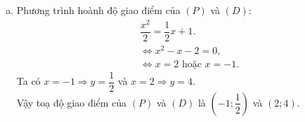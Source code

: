 \begin{ex}
{\begin{enumerate}[a)]
\begin{center}
				\end{center}
				\item Phương trình hoành độ giao điểm của $(P)$ và $(D)$:
				\begin{align*}
				&\dfrac{x^2}{2}=\dfrac{1}{2}x+1.\\
				&\Leftrightarrow x^2-x-2=0,\\
				&\Leftrightarrow x=2 \text{ hoặc }x=-1.
				\end{align*} 
				Ta có $x=-1 \Rightarrow y=\dfrac{1}{2}$ và $x=2 \Rightarrow y=4$.\\
				Vậy toạ độ giao điểm của $(P)$ và $(D)$ là $\left(-1;\dfrac{1}{2} \right)$ và $(2;4)$.
			\end{enumerate}    		
		}
\end{ex}

